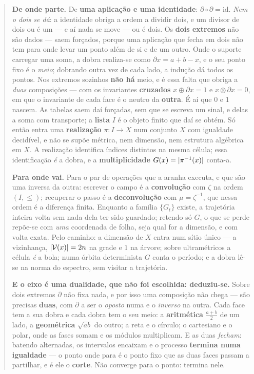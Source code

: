 \documentclass[livro.tex]{subfiles}
\begin{document}
\begin{abstract}\noindent
\textbf{De onde parte.} De \textbf{uma aplicação e uma identidade}:
$\partial\circ\partial=\mathrm{id}$. \emph{Nem o dois se dá}: a identidade obriga
a ordem a dividir dois, e um divisor de dois ou é um --- e aí nada se move --- ou
é dois. Os \textbf{dois extremos} não são dados --- saem
forçados, porque uma aplicação que fecha em dois não tem para onde levar um ponto
além de si e de um outro. Onde o suporte carregar uma soma, a dobra realiza-se
como $\partial x=a+b-x$, e o seu ponto fixo é o \emph{meio}; dobrando outra vez de
cada lado, a indução dá todos os pontos. Nos extremos sozinhos \textbf{não há}
meio, e é essa falta que obriga a \emph{duas} composições --- com os invariantes
\textbf{cruzados} $x\oplus\partial x=1$ e $x\otimes\partial x=0$, em que o
invariante de cada face é o neutro da \textbf{outra}. É aí que $0$ e $1$ nascem.
As tabelas
saem daí forçadas, sem que se escreva um sinal, e delas a soma com transporte; a
\textbf{lista} $I$ é o objeto finito que daí se obtém. Só então entra uma
\textbf{realização} $\pi\colon I\to X$ num conjunto $X$ com igualdade decidível,
e não se supõe métrica, nem dimensão, nem estrutura algébrica em $X$. A
realização identifica índices distintos na mesma célula; essa identificação
\emph{é} a dobra, e a \textbf{multiplicidade} $G(x)=\abs{\pi^{-1}(x)}$ conta-a.

\medskip\noindent\textbf{Para onde vai.} Para o par de operações que a aranha
executa, e que são uma inversa da outra: escrever o campo é a
\textbf{convolução} com $\zeta$ na ordem $(I,\le)$; recuperar o passo é a
\textbf{deconvolução} com $\mu=\zeta^{-1}$, que nessa ordem é a diferença finita.
Enquanto a família $\{G_t\}$ existe, a trajetória inteira volta sem nada dela ter
sido guardado; retendo só $G$, o que se perde repõe-se com \emph{uma} coordenada
de folha, seja qual for a dimensão, e com volta exata. Pelo caminho: a dimensão
de $X$ entra num sítio único --- a vizinhança, $\abs{\mathcal V(x)}=2n$ na grade
e $1$ na árvore; sobre ultramétricos a célula \emph{é} a bola; numa órbita
determinista $G$ conta o período; e a dobra lê-se na norma do espectro, sem
visitar a trajetória.

\medskip\noindent\textbf{E o eixo é uma dualidade, que não foi escolhida:
deduziu-se.} Sobre dois extremos $\partial$ não fixa nada, e por isso uma
composição não chega --- são precisas \textbf{duas}, com $\partial$ a ser o
\emph{oposto} numa e o \emph{inverso} na outra. Cada face tem a sua dobra e cada
dobra tem o seu meio: a \textbf{aritmética} $\frac{a+b}{2}$ de um lado, a
\textbf{geométrica} $\sqrt{ab}$ do outro; a reta e o círculo; o cartesiano e o
polar, onde as fases somam e os módulos multiplicam. E as duas \emph{fecham}:
batendo alternadas, os intervalos encaixam e o processo \textbf{termina numa
igualdade} --- o ponto onde para é o ponto fixo que as duas faces passam a
partilhar, e é ele o \textbf{corte}. Não converge para o ponto: termina nele.


\end{abstract}
\end{document}
